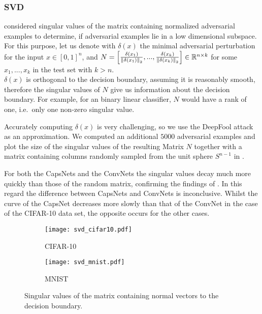 \subsubsection{SVD}
\citet{universal} considered singular values of the matrix containing normalized adversarial examples to determine, if adversarial examples lie in a low dimensional subspace. \\
For this purpose, let us denote with $\delta(x)$ the minimal adversarial perturbation for the input $x \in [0,1]^n$,
and $ N = \begin{bmatrix}
\frac{\delta(x_1)} {\left \lVert \delta(x_1) \right \rVert _{2}},  ...,  \frac{\delta(x_k)} {\left \lVert \delta(x_k) \right \rVert _{2}} 
\end{bmatrix}
\in \mathbb{R}^{n \times k}
$ for some $x_1, ..., x_k$ in the test set with $k > n$. \\
$\delta(x)$ is orthogonal to the decision boundary, assuming it is reasonably smooth, therefore the singular values of $N$ give us information about the decision boundary. For example, for an binary linear classifier, $N$ would have a rank of one, i.e.\ only one non-zero singular value.

Accurately computing $\delta(x)$ is very challenging, so we use the DeepFool attack as an approximation.
We computed an additional $5000$ adversarial examples and plot the size of the singular values of the resulting Matrix $N$ together with a matrix containing columns randomly sampled from the unit sphere $S^{n-1}$ in .

For both the CapsNets and the ConvNets the singular values decay much more quickly than those of the random matrix, confirming the findings of \citet{universal}.
In this regard the difference between CapsNets and ConvNets is inconclusive.
Whilst the curve of the CapsNet decreases more slowly than that of the ConvNet in the case of the CIFAR-10 data set, the opposite occurs for the other cases. 


\begin{figure}
	\centering
	\begin{subfigure}{.5\textwidth}
		\texttt{[image: svd\_cifar10.pdf]}
		\caption{CIFAR-10}
	\end{subfigure}%
	\begin{subfigure}{.5\textwidth}
		\texttt{[image: svd\_mnist.pdf]}
		\caption{MNIST}
	\end{subfigure}
	
	\caption{Singular values of the matrix containing normal vectors to the decision boundary.}
	\label{fig:svd}
\end{figure}

